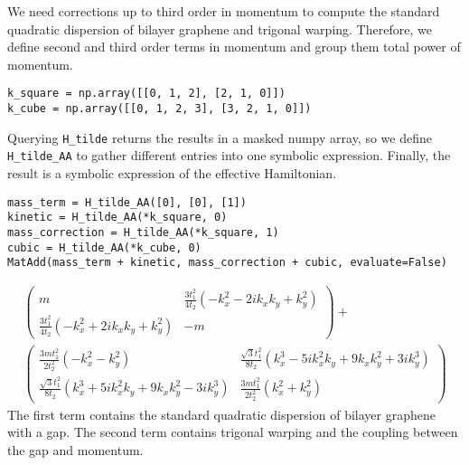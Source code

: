 We need corrections up to third order in momentum to compute the standard
quadratic dispersion of bilayer graphene and trigonal warping.
Therefore, we define second and third order terms in momentum and group them
total power of momentum.
%
\begin{verbatim}
k_square = np.array([[0, 1, 2], [2, 1, 0]])
k_cube = np.array([[0, 1, 2, 3], [3, 2, 1, 0]])
\end{verbatim}
%
Querying \texttt{H_tilde} returns the results in a masked numpy array, so we
define \texttt{H_tilde_AA} to gather different entries into one symbolic expression.
Finally, the result is a symbolic expression of the effective Hamiltonian.
%
\begin{verbatim}
mass_term = H_tilde_AA([0], [0], [1])
kinetic = H_tilde_AA(*k_square, 0)
mass_correction = H_tilde_AA(*k_square, 1)
cubic = H_tilde_AA(*k_cube, 0)
MatAdd(mass_term + kinetic, mass_correction + cubic, evaluate=False)
\end{verbatim}
%
{\small
\begin{gather}
\begin{pmatrix}
m & \frac{3 t_1^2}{4 t_2} ( - k_x^2 - 2ik_x k_y + k_y^2) \\
\frac{3 t_1^2}{4 t_2} ( - k_x^2 + 2ik_x k_y + k_y^2) & -m
\end{pmatrix} + \nonumber \\
\begin{pmatrix}
\frac{3 m t_1^2}{2 t_2^2} ( - k_x^2 - k_y^2) & \frac{\sqrt{3} t_1^2}{8 t_2} (k_x^3 - 5ik_x^2 k_y + 9 k_x k_y^2 + 3ik_y^3) \\
\frac{\sqrt{3} t_1^2}{8 t_2} (k_x^3 + 5ik_x^2 k_y + 9 k_x k_y^2 - 3ik_y^3) & \frac{3 m t_1^2}{2 t_2^2} (k_x^2 + k_y^2)
\end{pmatrix} \nonumber
\end{gather}
}
%
%
The first term contains the standard quadratic dispersion of bilayer graphene
with a gap.
The second term contains trigonal warping and the coupling between the gap and
momentum.

